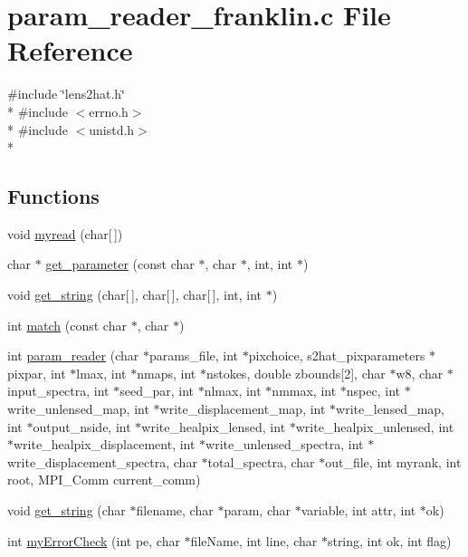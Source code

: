 \section{param\-\_\-reader\-\_\-franklin.\-c File Reference}
\label{param__reader__franklin_8c}
{\ttfamily \#include \char`\"{}lens2hat.\-h\char`\"{}}\\*
{\ttfamily \#include $<$errno.\-h$>$}\\*
{\ttfamily \#include $<$unistd.\-h$>$}\\*
\subsection*{Functions}
\begin{DoxyCompactItemize}
\item 
void \hyperlink{param__reader__franklin_8c_a50c0568f618886d78986c4a9d6a23ba4}{myread} (char\mbox{[}$\,$\mbox{]})
\item 
char $\ast$ \hyperlink{param__reader__franklin_8c_a9fe5196c232c1b3d4e22d77b0e74fbe1}{get\-\_\-parameter} (const char $\ast$, char $\ast$, int, int $\ast$)
\item 
void \hyperlink{param__reader__franklin_8c_acdf8e6c6f50db79679922d3dbf74dd84}{get\-\_\-string} (char\mbox{[}$\,$\mbox{]}, char\mbox{[}$\,$\mbox{]}, char\mbox{[}$\,$\mbox{]}, int, int $\ast$)
\item 
int \hyperlink{param__reader__franklin_8c_af71971b64e93dd85136d531400035e57}{match} (const char $\ast$, char $\ast$)
\item 
int \hyperlink{param__reader__franklin_8c_ab6bacb8b57a4a9612bd4d7a8ec68dfb9}{param\-\_\-reader} (char $\ast$params\-\_\-file, int $\ast$pixchoice, s2hat\-\_\-pixparameters $\ast$pixpar, int $\ast$lmax, int $\ast$nmaps, int $\ast$nstokes, double zbounds\mbox{[}2\mbox{]}, char $\ast$w8, char $\ast$input\-\_\-spectra, int $\ast$seed\-\_\-par, int $\ast$nlmax, int $\ast$nmmax, int $\ast$nspec, int $\ast$write\-\_\-unlensed\-\_\-map, int $\ast$write\-\_\-displacement\-\_\-map, int $\ast$write\-\_\-lensed\-\_\-map, int $\ast$output\-\_\-nside, int $\ast$write\-\_\-healpix\-\_\-lensed, int $\ast$write\-\_\-healpix\-\_\-unlensed, int $\ast$write\-\_\-healpix\-\_\-displacement, int $\ast$write\-\_\-unlensed\-\_\-spectra, int $\ast$write\-\_\-displacement\-\_\-spectra, char $\ast$total\-\_\-spectra, char $\ast$out\-\_\-file, int myrank, int root, M\-P\-I\-\_\-\-Comm current\-\_\-comm)
\item 
void \hyperlink{param__reader__franklin_8c_a1be51b19c79f5c49c6ce2128259fc093}{get\-\_\-string} (char $\ast$filename, char $\ast$param, char $\ast$variable, int attr, int $\ast$ok)
\item 
int \hyperlink{param__reader__franklin_8c_a70bcbd531a6e4abc62d73f5b4532c2cc}{my\-Error\-Check} (int pe, char $\ast$file\-Name, int line, char $\ast$string, int ok, int flag)
\end{DoxyCompactItemize}


